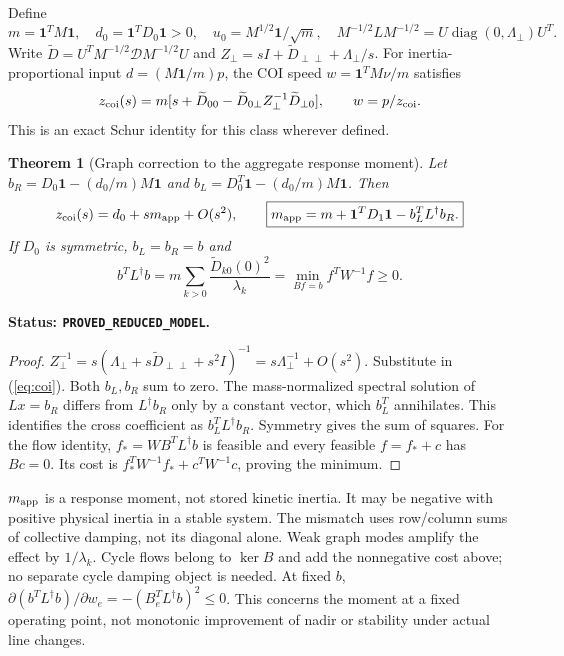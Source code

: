 \documentclass[11pt]{article}
\newtheorem{theorem}{Theorem}
\newcommand{\diag}{\operatorname{diag}}
\newcommand{\one}{\mathbf{1}}
\newcommand{\status}[1]{\par\smallskip\noindent\textbf{Status: \texttt{#1}.}\ }
\begin{document}
Define
\[
 m=\one^TM\one,\quad d_0=\one^TD_0\one>0,\quad
 u_0=M^{1/2}\one/\sqrt m,\quad
 M^{-1/2}LM^{-1/2}=U\diag(0,\Lambda_\perp)U^T .
\]
Write $\widetilde D=U^TM^{-1/2}\mathcal D M^{-1/2}U$ and
$Z_\perp=sI+\widetilde D_{\perp\perp}+\Lambda_\perp/s$.
For inertia-proportional input $d=(M\one/m)p$, the COI speed
$w=\one^TM\nu/m$ satisfies
\begin{equation}
 z_{\rm coi}(s)=m[s+\widetilde D_{00}
 -\widetilde D_{0\perp}Z_\perp^{-1}\widetilde D_{\perp0}],
 \qquad w=p/z_{\rm coi}. \label{eq:coi}
\end{equation}
This is an exact Schur identity for this class wherever defined.

\begin{theorem}[Graph correction to the aggregate response moment]
Let $b_R=D_0\one-(d_0/m)M\one$ and
$b_L=D_0^T\one-(d_0/m)M\one$. Then
\begin{equation}
 z_{\rm coi}(s)=d_0+s m_{\rm app}+O(s^2),\qquad
 \boxed{m_{\rm app}=m+\one^TD_1\one-b_L^TL^\dagger b_R.} \label{eq:moment}
\end{equation}
If $D_0$ is symmetric, $b_L=b_R=b$ and
\begin{equation}
 \boxed{b^TL^\dagger b
 =m\sum_{k>0}\frac{\widetilde D_{k0}(0)^2}{\lambda_k}
 =\min_{Bf=b} f^TW^{-1}f\geq0.} \label{eq:flow}
\end{equation}
\end{theorem}
\status{PROVED\_REDUCED\_MODEL}
\begin{proof}
$Z_\perp^{-1}=s(\Lambda_\perp+s\widetilde D_{\perp\perp}+s^2I)^{-1}
=s\Lambda_\perp^{-1}+O(s^2)$. Substitute in (\ref{eq:coi}).
Both $b_L,b_R$ sum to zero. The mass-normalized spectral solution of
$Lx=b_R$ differs from $L^\dagger b_R$ only by a constant vector,
which $b_L^T$ annihilates. This identifies the cross coefficient as
$b_L^TL^\dagger b_R$. Symmetry gives the sum of squares.
For the flow identity, $f_*=WB^TL^\dagger b$ is feasible and
every feasible $f=f_*+c$ has $Bc=0$.
Its cost is $f_*^TW^{-1}f_*+c^TW^{-1}c$, proving the minimum.
\end{proof}
$m_{\rm app}$ is a response moment, not stored kinetic inertia.
It may be negative with positive physical inertia in a stable system.
The mismatch uses row/column sums of collective damping, not its
diagonal alone. Weak graph modes amplify the effect by $1/\lambda_k$.
Cycle flows belong to $\ker B$ and add the nonnegative cost above;
no separate cycle damping object is needed.
At fixed $b$, $\partial(b^TL^\dagger b)/\partial w_e
=-(B_e^TL^\dagger b)^2\leq0$.
This concerns the moment at a fixed operating point, not monotonic
improvement of nadir or stability under actual line changes.
\end{document}
